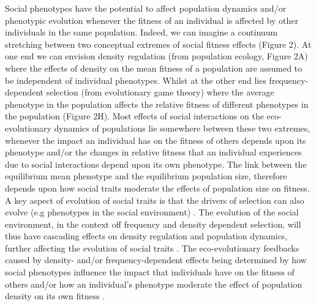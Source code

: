 \documentclass{article}
\begin{document}
Social phenotypes have the potential to affect population dynamics and/or phenotypic evolution whenever the fitness of an individual is affected by other individuals in the same population. Indeed, we can imagine a continuum stretching between two conceptual extremes of social fitness effects (Figure 2). At one end we can envision density regulation (from population ecology, Figure 2A) where the effects of density on the mean fitness of a population are assumed to be independent of individual phenotypes. Whilst at the other end lies frequency-dependent selection (from evolutionary game theory) where the average phenotype in the population affects the relative fitness of different phenotypes in the population (Figure 2H). Most effects of social interactions on the eco-evolutionary dynamics of populations lie somewhere between these two extremes, whenever the impact an individual has on the fitness of others depends upon its phenotype and/or the changes in relative fitness that an individual experiences due to social interactions depend upon its own phenotype. The link between the equilibrium mean phenotype and the equilibrium population size, therefore depends upon how social traits moderate the effects of population size on fitness. A key aspect of evolution of social traits is that the drivers of selection can also evolve (e.g phenotypes in the social environment) \citep{West-Eberhard1979, Moore1997}. The evolution of the social environment, in the context off frequency and density dependent selection, will thus have cascading effects on density regulation and population dynamics, further affecting the evolution of social traits \citep{Heino1998}. The eco-evolutionary feedbacks caused by density- and/or frequency-dependent effects being determined by how social phenotypes influence the impact that individuals have on the fitness of others and/or how an individual's phenotype moderate the effect of population density on its own fitness \citep{Engen2020}. 
\end{document}
